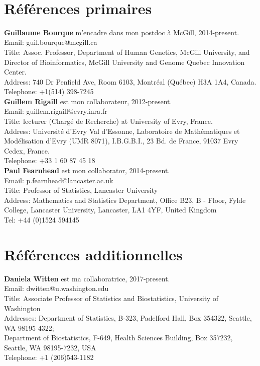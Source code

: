 \documentclass{article}
\begin{document}
\mbox{ }

\section*{Références primaires}

{\bf Guillaume Bourque} m'encadre dans mon postdoc à McGill, 2014-present.\\
Email: guil.bourque@mcgill.ca\\
Title: Assoc. Professor, Department of Human Genetics, McGill University, and\\
Director of Bioinformatics, McGill University and Genome Quebec Innovation Center. \\
Address: 740 Dr Penfield Ave, Room 6103, Montréal (Québec) H3A 1A4, Canada.\\
Telephone: +1(514) 398-7245\\

{\bf Guillem Rigaill} est mon collaborateur, 2012-present.\\
Email: guillem.rigaill@evry.inra.fr\\
Title: lecturer (Charg\'e de Recherche) at University of Evry, France.\\
Address: Universit\'e d'Evry Val d'Essonne,
Laboratoire de Math\'ematiques et Mod\'elisation d'Evry (UMR 8071),
I.B.G.B.I., 23 Bd. de France, 91037 Evry Cedex,
France.\\
Telephone: +33 1 60 87 45 18\\

{\bf Paul Fearnhead} est mon collaborator, 2014-present.\\
Email: p.fearnhead@lancaster.ac.uk\\
Title: Professor of Statistics, Lancaster University\\
Address: Mathematics and Statistics Department,
Office B23, B - Floor, Fylde College,
Lancaster University,
Lancaster, LA1 4YF,
United Kingdom\\
Tel: +44 (0)1524 594145\\

\section*{Références additionnelles}

{\bf Daniela Witten} est ma collaboratrice, 2017-present.\\
Email: dwitten@u.washington.edu\\
Title: Associate Professor of Statistics and Biostatistics, University of Washington\\
Addresses:
Department of Statistics,
B-323, Padelford Hall, Box 354322,
Seattle, WA 98195-4322;\\
Department of Biostatistics,
F-649, Health Sciences Building, Box 357232,
Seattle, WA 98195-7232,
USA\\
Telephone: +1 (206)543-1182\\
\end{document}
